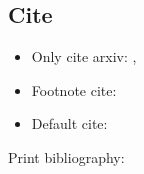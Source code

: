 \subsection{Cite}
\begin{iframe}
\begin{itemize}
    \item Only cite arxiv: ,
    \item Footnote cite: 
    \item Default cite: \cite{hep-ph/0201036}
\end{itemize}

Print bibliography:

\printbibliography
\end{iframe}